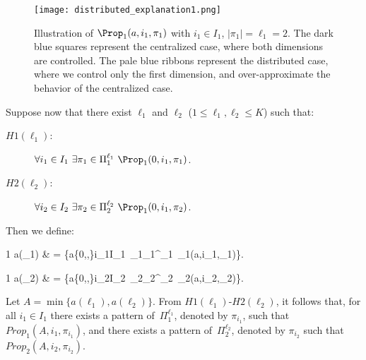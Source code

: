 \begin{figure}[t]
  \centering
 \texttt{[image: distributed\_explanation1.png]}

  \caption{Illustration of  $\Prop_1(a,i_1,\pi_1)$  with $i_1 \in I_1$,
$|\pi_1|=\ell_1=2$. The dark blue squares represent the centralized case, where both dimensions
are controlled. The pale blue ribbons represent the distributed case, where we control only
the first dimension, and over-approximate the behavior of the centralized case.}
 \label{fig:Q1}
\end{figure}

\medskip

Suppose now that there exist $\ell_1$ and $\ell_2$
($1\leq \ell_1,\ell_2\leq K$) such that:
\begin{description}
\item[$H1(\ell_1)$:] 
$\forall i_1\in I_1\  
\exists \pi_1\in \Pi_1^{\ell_1}\  
\Prop_1(0,i_1,\pi_1)$.

\item[$H2(\ell_2)$:] 
$\forall i_2\in I_2\  
\exists \pi_2\in \Pi_2^{\ell_2}\  
\Prop_1(0,i_1,\pi_2)$.
\end{description}
Then we define:
\begin{xalignat*}1
a(\ell_1) & =  \max\{a\in\{0,\frac{|R|}{100},\frac{|R|}{10}\}\mid \forall i_1\in I_1\ \exists \pi_1\in \Pi_1^{\ell_1}\ \Prop_1(a,i_1,\pi_1)\}.
\end{xalignat*}
\begin{xalignat*}1
a(\ell_2) & =  \max\{a\in\{0,,\}\mid \forall i_2\in I_2\ \exists \pi_2\in \Pi_2^{\ell_2}\ \Prop_2(a,i_2,\pi_2)\}.
\end{xalignat*}
Let
$A=\min\{a(\ell_1),a(\ell_2)\}$.
%
From $H1(\ell_1)$-$H2(\ell_2)$, it follows 
that, for all $i_1\in I_1$ there exists
a pattern of~$\Pi_1^{\ell_1}$, denoted by $\pi_{i_1}$, such that
$Prop_1(A,i_1,\pi_{i_1})$, and there exists
a pattern of~$\Pi_2^{\ell_2}$, denoted by $\pi_{i_2}$ such that
$Prop_2(A,i_2,\pi_{i_2})$.

